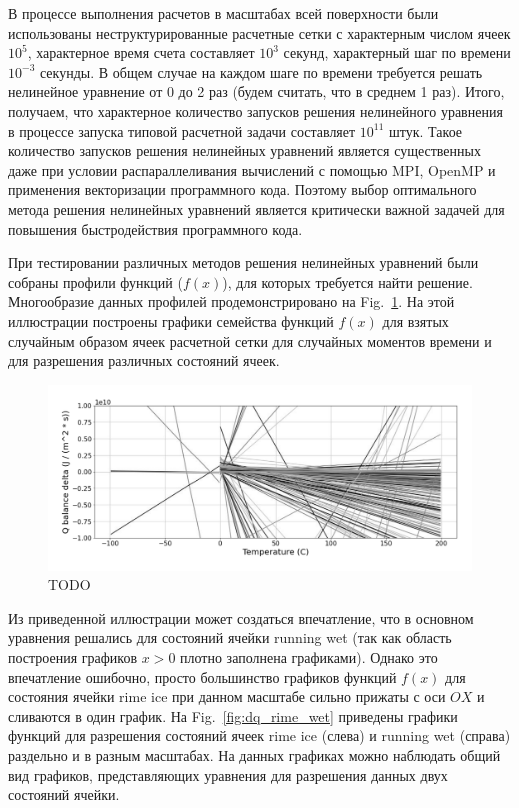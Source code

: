 \documentclass[
11pt,%
tightenlines,%
twoside,%
onecolumn,%
nofloats,%
nobibnotes,%
nofootinbib,%
superscriptaddress,%
noshowpacs,%
centertags]%
{revtex4}
\begin{document}
В процессе выполнения расчетов в масштабах всей поверхности были использованы неструктурированные расчетные сетки с характерным числом ячеек $10^5$, характерное время счета составляет $10^3$ секунд, характерный шаг по времени $10^{-3}$ секунды.
В общем случае на каждом шаге по времени требуется решать нелинейное уравнение от 0 до 2 раз (будем считать, что в среднем 1 раз).
Итого, получаем, что характерное количество запусков решения нелинейного уравнения в процессе запуска типовой расчетной задачи составляет $10^11$ штук.
Такое количество запусков решения нелинейных уравнений является существенных даже при условии распараллеливания вычислений с помощью MPI, OpenMP и применения векторизации программного кода.
Поэтому выбор оптимального метода решения нелинейных уравнений является критически важной задачей для повышения быстродействия программного кода.

При тестировании различных методов решения нелинейных уравнений были собраны профили функций ($f(x)$), для которых требуется найти решение.
Многообразие данных профилей продемонстрировано на Fig.~\ref{fig:dq}.
На этой иллюстрации построены графики семейства функций $f(x)$ для взятых случайным образом ячеек расчетной сетки для случайных моментов времени и для разрешения различных состояний ячеек.

\begin{figure}[h]
\setcaptionmargin{5mm}
\onelinecaptionstrue
\includegraphics[width=1.0\textwidth]{pics/dq.pdf}
\caption{TODO}\label{fig:dq}
\end{figure}

Из приведенной иллюстрации может создаться впечатление, что в основном уравнения решались для состояний ячейки running wet (так как область построения графиков $x > 0$ плотно заполнена графиками).
Однако это впечатление ошибочно, просто большинство графиков функций $f(x)$ для состояния ячейки rime ice при данном масштабе сильно прижаты с оси $OX$ и сливаются в один график.
На Fig.~\ref{fig:dq_rime_wet} приведены графики функций для разрешения состояний ячеек rime ice (слева) и running wet (справа) раздельно и в разным масштабах.
На данных графиках можно наблюдать общий вид графиков, представляющих уравнения для разрешения данных двух состояний ячейки.
\end{document}
